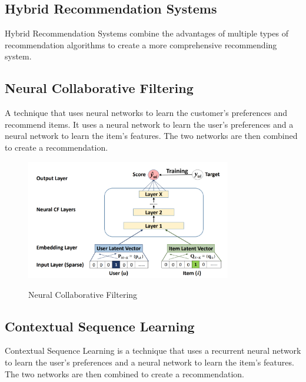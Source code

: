 \subsection{Hybrid Recommendation Systems}
Hybrid Recommendation Systems combine the advantages of multiple types of recommendation algorithms to create a more comprehensive recommending system.
\subsection{Neural Collaborative Filtering}
A technique that uses neural networks to learn the customer's preferences and recommend items. It uses a neural network to learn the user's preferences and a neural network to learn the item's features. The two networks are then combined to create a recommendation.
\begin{figure}[H]
    \centering
    \includegraphics[width=0.8\textwidth]{assets/neural-collaborative-filtering.png}
    \caption{Neural Collaborative Filtering}
    \label{fig:neural-collaborative-filtering}
    \cite{NvidiaRecSys}
\end{figure}

\subsection{Contextual Sequence Learning}
Contextual Sequence Learning is a technique that uses a recurrent neural network to learn the user's preferences and a neural network to learn the item's features. The two networks are then combined to create a recommendation.
